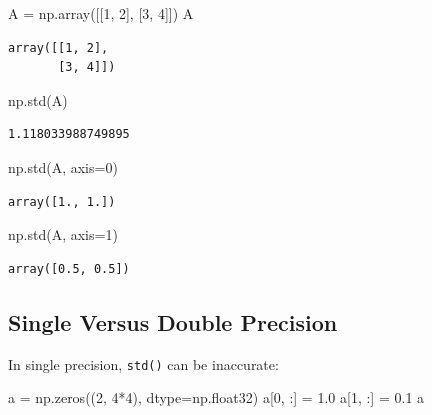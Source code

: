 \documentclass[
  letterpaper,
  DIV=11,
  numbers=noendperiod]{scrreprt}
\newenvironment{Shaded}{\begin{snugshade}}{\end{snugshade}}
\newcommand{\DecValTok}[1]{\textcolor[rgb]{0.68,0.00,0.00}{#1}}
\newcommand{\FloatTok}[1]{\textcolor[rgb]{0.68,0.00,0.00}{#1}}
\newcommand{\NormalTok}[1]{\textcolor[rgb]{0.00,0.23,0.31}{#1}}
\newcommand{\OperatorTok}[1]{\textcolor[rgb]{0.37,0.37,0.37}{#1}}
\begin{document}
\begin{Shaded}
\begin{Highlighting}[]
\NormalTok{A }\OperatorTok{=}\NormalTok{ np.array([[}\DecValTok{1}\NormalTok{, }\DecValTok{2}\NormalTok{], [}\DecValTok{3}\NormalTok{, }\DecValTok{4}\NormalTok{]])}
\NormalTok{A}
\end{Highlighting}
\end{Shaded}

\begin{verbatim}
array([[1, 2],
       [3, 4]])
\end{verbatim}

\begin{Shaded}
\begin{Highlighting}[]
\NormalTok{np.std(A)}
\end{Highlighting}
\end{Shaded}

\begin{verbatim}
1.118033988749895
\end{verbatim}

\begin{Shaded}
\begin{Highlighting}[]
\NormalTok{np.std(A, axis}\OperatorTok{=}\DecValTok{0}\NormalTok{)}
\end{Highlighting}
\end{Shaded}

\begin{verbatim}
array([1., 1.])
\end{verbatim}

\begin{Shaded}
\begin{Highlighting}[]
\NormalTok{np.std(A, axis}\OperatorTok{=}\DecValTok{1}\NormalTok{)}
\end{Highlighting}
\end{Shaded}

\begin{verbatim}
array([0.5, 0.5])
\end{verbatim}

\hypertarget{single-versus-double-precision}{%
\subsection{Single Versus Double
Precision}\label{single-versus-double-precision}}

In single precision, \texttt{std()} can be inaccurate:

\begin{Shaded}
\begin{Highlighting}[]
\NormalTok{a }\OperatorTok{=}\NormalTok{ np.zeros((}\DecValTok{2}\NormalTok{, }\DecValTok{4}\OperatorTok{*}\DecValTok{4}\NormalTok{), dtype}\OperatorTok{=}\NormalTok{np.float32)}
\NormalTok{a[}\DecValTok{0}\NormalTok{, :] }\OperatorTok{=} \FloatTok{1.0}
\NormalTok{a[}\DecValTok{1}\NormalTok{, :] }\OperatorTok{=} \FloatTok{0.1}
\NormalTok{a }
\end{Highlighting}
\end{Shaded}
\end{document}
